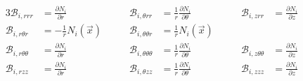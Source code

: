 \documentclass[times,namecite]{goose-article}
\begin{document}
\begin{alignat}{3}
  \mathcal{B}_{i,r      r      r     } &=             \frac{\partial N_i}{\partial r}      & \qquad
  \mathcal{B}_{i,\theta r      r     } &= \frac{1}{r} \frac{\partial N_i}{\partial \theta} & \qquad
  \mathcal{B}_{i,z      r      r     } &=             \frac{\partial N_i}{\partial z}
  \nonumber
  \\
  \mathcal{B}_{i,r      \theta r     } &= - \frac{1}{r} N_i (\vec{x})  & \qquad
  \mathcal{B}_{i,\theta \theta r     } &=   \frac{1}{r} N_i (\vec{x})  & \qquad
  \nonumber
  \\
  \mathcal{B}_{i,r      \theta \theta} &=             \frac{\partial N_i}{\partial r}       & \qquad
  \mathcal{B}_{i,\theta \theta \theta} &= \frac{1}{r} \frac{\partial N_i}{\partial \theta}  & \qquad
  \mathcal{B}_{i,z      \theta \theta} &=             \frac{\partial N_i}{\partial z}
  \\
  \mathcal{B}_{i,r      z      z     } &=             \frac{\partial N_i}{\partial r}       & \qquad
  \mathcal{B}_{i,\theta z      z     } &= \frac{1}{r} \frac{\partial N_i}{\partial \theta}  & \qquad
  \mathcal{B}_{i,z      z      z     } &=             \frac{\partial N_i}{\partial z}
\end{alignat}
\end{document}
